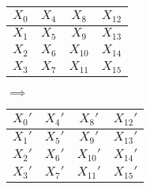 \begin{center}
	\begin{minipage}{.4\textwidth}\centering
		\begin{tabular}{|c|c|c|c|}
			\hline
			\cellcolor{red!20}$X_0$ & \cellcolor{green!20}$X_4$ & \cellcolor{blue!20}$X_8$ & \cellcolor{yellow!20}$X_{12}$ \\ \hline
			\cellcolor{red!20}$X_1$ & \cellcolor{green!20}$X_5$ & \cellcolor{blue!20}$X_9$ & \cellcolor{yellow!20}$X_{13}$ \\ \hline
			\cellcolor{red!20}$X_2$ & \cellcolor{green!20}$X_6$ & \cellcolor{blue!20}$X_{10}$ & \cellcolor{yellow!20}$X_{14}$ \\ \hline
			\cellcolor{red!20}$X_3$ & \cellcolor{green!20}$X_7$ & \cellcolor{blue!20}$X_{11}$ & \cellcolor{yellow!20}$X_{15}$ \\ \hline
		\end{tabular}
	\end{minipage}$\implies$\begin{minipage}{.4\textwidth}\centering
		\begin{tabular}{|c|c|c|c|}
			\hline
			\cellcolor{red!20}$X_0'$ & \cellcolor{green!20}$X_4'$ & \cellcolor{blue!20}$X_8'$ & \cellcolor{yellow!20}$X_{12}'$ \\ \hline
			\cellcolor{red!20}$X_1'$ & \cellcolor{green!20}$X_5'$ & \cellcolor{blue!20}$X_9'$ & \cellcolor{yellow!20}$X_{13}'$ \\ \hline
			\cellcolor{red!20}$X_2'$ & \cellcolor{green!20}$X_6'$ & \cellcolor{blue!20}$X_{10}'$ & \cellcolor{yellow!20}$X_{14}'$ \\ \hline
			\cellcolor{red!20}$X_3'$ & \cellcolor{green!20}$X_7'$ & \cellcolor{blue!20}$X_{11}'$ & \cellcolor{yellow!20}$X_{15}'$ \\ \hline
		\end{tabular}
	\end{minipage}
\end{center}

